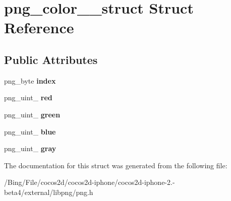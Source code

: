 \hypertarget{structpng__color__16__struct}{\section{png\-\_\-color\-\_\-\_\-struct Struct Reference}
\label{structpng__color__16__struct}
}
\subsection*{Public Attributes}
\begin{DoxyCompactItemize}
\item 
\hypertarget{structpng__color__16__struct_a44a918da0d9a50cf94fcad5a3c741ee0}{png\-\_\-byte {\bfseries index}}\label{structpng__color__16__struct_a44a918da0d9a50cf94fcad5a3c741ee0}

\item 
\hypertarget{structpng__color__16__struct_a069bad345aefbe4eab29fcc1d8af91e6}{png\-\_\-uint\-\_ {\bfseries red}}\label{structpng__color__16__struct_a069bad345aefbe4eab29fcc1d8af91e6}

\item 
\hypertarget{structpng__color__16__struct_af01259ffd46c78eff9b1ad584a295126}{png\-\_\-uint\-\_ {\bfseries green}}\label{structpng__color__16__struct_af01259ffd46c78eff9b1ad584a295126}

\item 
\hypertarget{structpng__color__16__struct_afd68833319d436582aa5911de7cdd46b}{png\-\_\-uint\-\_ {\bfseries blue}}\label{structpng__color__16__struct_afd68833319d436582aa5911de7cdd46b}

\item 
\hypertarget{structpng__color__16__struct_a660a572a0a2f4094408f2fecb61571ac}{png\-\_\-uint\-\_ {\bfseries gray}}\label{structpng__color__16__struct_a660a572a0a2f4094408f2fecb61571ac}

\end{DoxyCompactItemize}


The documentation for this struct was generated from the following file\-:\begin{DoxyCompactItemize}
\item 
/\-Bing/\-File/cocos2d/cocos2d-\/iphone/cocos2d-\/iphone-\/2.-\/beta4/external/libpng/png.\-h\end{DoxyCompactItemize}
